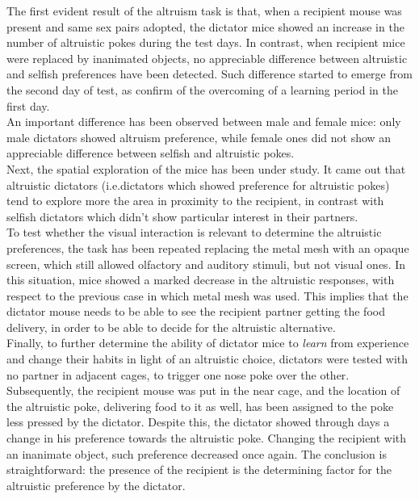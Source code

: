 \documentclass[a4paper]{article}
\begin{document}
The first evident result of the altruism task is that, when a recipient mouse was present and same sex pairs adopted, the dictator mice showed an increase in the number of altruistic pokes during the test days. In contrast, when recipient mice were replaced by inanimated objects, no appreciable difference between altruistic and selfish preferences have been detected. Such difference started to emerge from the second day of test, as confirm of the overcoming of a learning period in the first day. \\
An important difference has been observed between male and female mice:  only male dictators showed altruism preference, while female ones did not show an appreciable difference between selfish and altruistic pokes.\\
Next, the spatial exploration of the mice has been under study. It came out that altruistic dictators (i.e.dictators which showed preference for altruistic pokes) tend to explore more the area in proximity to the recipient, in contrast with selfish dictators which didn't show particular interest in their partners.\\
To test whether the visual interaction is relevant to determine the altruistic preferences, the task has been repeated replacing the metal mesh with an opaque screen, which still allowed olfactory and auditory stimuli, but not visual ones. In this situation, mice showed a marked decrease in the altruistic responses, with respect to the previous case in which metal mesh was used. This implies that the dictator mouse needs to be able to see the recipient partner getting the food delivery, in order to be able to decide for the altruistic alternative.\\
Finally, to further determine the ability of dictator mice to \textit{learn} from experience and change their habits in light of an altruistic choice, dictators were tested with no partner in adjacent cages, to trigger one nose poke over the other. Subsequently, the recipient mouse was put in the near cage, and the location of the altruistic poke, delivering food to it as well, has been assigned to the poke less pressed by the dictator. Despite this, the dictator showed through days a change in his preference towards the altruistic poke. Changing the recipient with an inanimate object, such preference decreased once again. The conclusion is straightforward: the presence of the recipient is the determining factor for the altruistic preference by the dictator.
\\
\end{document}
